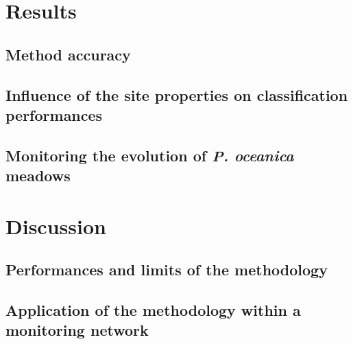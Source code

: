 \newpage

\section{Results}\label{chapitre3_3}

\subsection{Method accuracy}

\subsection{Influence of the site properties on classification performances}

\subsection{Monitoring the evolution of \textit{P. oceanica} meadows}

\newpage

\section{Discussion}\label{chapitre3_4}


\subsection{Performances and limits of the methodology}


\subsection{Application of the methodology within a monitoring network}

\newpage

